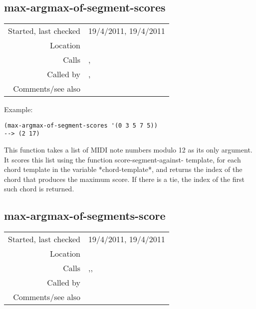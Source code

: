 \subsection*{max-argmax-of-segment-scores}\label{fun:max-argmax-of-segment-scores}

\vspace{0.3cm}
\begin{tabular}{r|p{8cm}}
Started, last checked & 19/4/2011, 19/4/2011 \\
Location & \nameref{sec:chord-labelling} \\
Calls & \nameref{fun:max-argmax},\newline \nameref{fun:score-segment-against-template} \\
Called by & \nameref{fun:HarmAn->labelling},\newline \nameref{fun:minimal-segment-scores} \\
Comments/see also &
\end{tabular}

\vspace{0.5cm}
\noindent Example:
\begin{verbatim}
(max-argmax-of-segment-scores '(0 3 5 7 5))
--> (2 17)
\end{verbatim}

\noindent This function takes a list of MIDI note
numbers modulo 12 as its only argument. It scores this
list using the function score-segment-against-
template, for each chord template in the variable
*chord-template*, and returns the index of the chord
that produces the maximum score. If there is a tie,
the index of the first such chord is returned.


\subsection*{max-argmax-of-segments-score}\label{fun:max-argmax-of-segments-score}

\vspace{0.3cm}
\begin{tabular}{r|p{8cm}}
Started, last checked & 19/4/2011, 19/4/2011 \\
Location & \nameref{sec:chord-labelling} \\
Calls & \nameref{fun:max-argmax},\newline \nameref{fun:score-segment-against-template}, \nameref{fun:segments2MNNs-mod12} \\
Called by & \nameref{fun:HarmAn->labelling} \\
Comments/see also &
\end{tabular}

